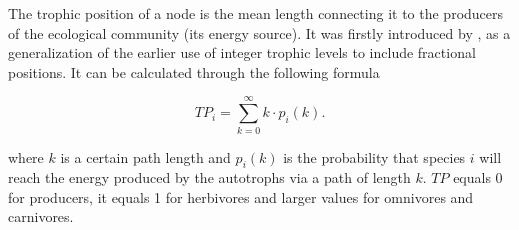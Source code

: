 The trophic position of a node is the mean length connecting it to the producers of the ecological community (its energy source). It was firstly introduced by \citet{Levine1980}, as a generalization of the earlier use of integer trophic levels to include fractional positions. It can be calculated through the following formula

        \begin{equation}
          TP_i=\sum\limits_{k=0}^\infty k \cdot p_i(k).
        \end{equation}

\noindent where $k$ is a certain path length and $p_i(k)$ is the probability that species $i$ will reach the energy produced by the autotrophs via a path of length $k$. $TP$ equals 0 for producers, it equals 1 for herbivores and larger values for omnivores and carnivores.
